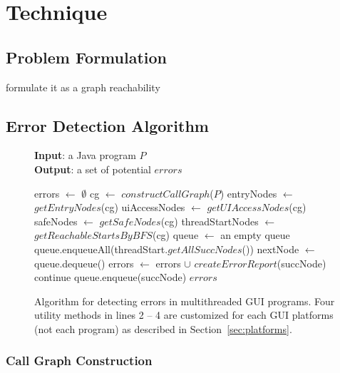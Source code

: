 \section{Technique}

\subsection{Problem Formulation}

formulate it as a graph reachability

\subsection{Error Detection Algorithm}


\begin{figure}[t]
\textbf{Input}: a Java program $P$\\
\textbf{Output}: a set of potential $errors$\\
\vspace{-5mm}
\begin{algorithmic}[1]
\STATE errors $\leftarrow$ $\emptyset$
\STATE cg $\leftarrow$ $constructCallGraph$($P$)
\STATE entryNodes $\leftarrow$ $getEntryNodes$(cg)
\STATE uiAccessNodes $\leftarrow$ $getUIAccessNodes$(cg)
\STATE safeNodes $\leftarrow$ $getSafeNodes$(cg)
\STATE threadStartNodes $\leftarrow$ $getReachableStartsByBFS$(cg)
\STATE queue $\leftarrow$ an empty queue
\STATE queue.enqueueAll(threadStart.$getAllSuccNodes$())
\STATE nextNode $\leftarrow$ queue.dequeue()
\STATE errors $\leftarrow$ errors $\cup$ $createErrorReport$(succNode)
\STATE continue
\ELSE
\STATE queue.enqueue(succNode)
\ENDIF 
\ENDFOR
\ENDWHILE
\ENDFOR
\ENDFOR
\RETURN $errors$
\vspace{-2mm}
\end{algorithmic}
\caption{Algorithm for detecting errors in multithreaded GUI programs. 
Four utility methods in lines 2 -- 4 are customized for each GUI platforms
(not each program) as described in Section~\ref{sec:platforms}.
} \label{fig:detectalgorithm}
\end{figure}


\subsubsection{Call Graph Construction}

